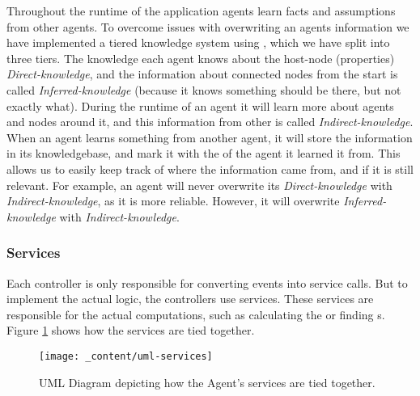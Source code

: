 Throughout the runtime of the application agents learn facts and assumptions from other agents. To overcome issues with overwriting an agents information we have implemented a tiered knowledge system using , which we have split into three tiers. The knowledge each agent knows about the host-node (properties) \emph{Direct-knowledge}, and the information about connected nodes from the start is called \emph{Inferred-knowledge} (because it knows something should be there, but not exactly what). During the runtime of an agent it will learn more about agents and nodes around it, and this information from other is called \emph{Indirect-knowledge}. When an agent learns something from another agent, it will store the information in its knowledgebase, and mark it with the  of the agent it learned it from. This allows us to easily keep track of where the information came from, and if it is still relevant. For example, an agent will never overwrite its \emph{Direct-knowledge} with \emph{Indirect-knowledge}, as it is more reliable. However, it will overwrite \emph{Inferred-knowledge} with \emph{Indirect-knowledge}.

\subsubsection{Services}
\label{sssec:services}
Each controller is only responsible for converting events into service calls. But to implement the actual logic, the controllers use services. These services are responsible for the actual computations, such as calculating the  or finding s. Figure \ref{fig:uml-services} shows how the services are tied together.

\begin{figure}[H]
    \centering
    \texttt{[image: \_content/uml-services]}
    \caption{UML Diagram depicting how the Agent's services are tied together.}
    \label{fig:uml-services}
\end{figure}

